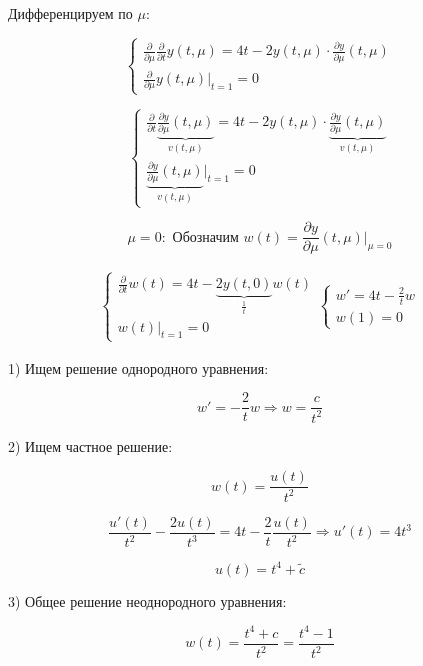 \documentclass[12pt, a4paper]{report}
\begin{document}
Дифференцируем по \( \mu  \): 

\[ \begin{cases}
    \displaystyle \frac{\partial  }{\partial  \mu } \frac{\partial  }{\partial  t } y(t ,\mu ) = 4 t - 2 y(t,\mu)   \cdot \frac{\partial  y }{\partial  \mu }(t,\mu ) \\
    \displaystyle \frac{\partial  }{\partial  \mu } y (t,\mu ) |_{t =1 }  =0 
\end{cases} \] 

\[ \begin{cases}
\displaystyle \frac{\partial  }{\partial  t } \underbrace{\frac{\partial  y }{\partial  \mu } (t ,\mu )}_{ v(t, \mu)} = 4 t - 2 y ( t, \mu ) \cdot \underbrace{\frac{\partial  y }{\partial  \mu } (t ,\mu )}_{ v(t, \mu)}   \\
\displaystyle \underbrace{\frac{\partial  y }{\partial  \mu } (t ,\mu )}_{ v(t, \mu)}|_{t =1 }  =0 
\end{cases} \] 

\[ \mu = 0 : \text{ Обозначим } w (t ) = \frac{\partial  y } {\partial  \mu } (t , \mu ) |_{\mu =0}    \] 

\[\begin{aligned}
    \begin{cases}
        \displaystyle \frac{\partial  }{\partial  t }w (t ) = 4 t - \underbrace{2 y (t, 0 )}_{\frac{1}{t} } w (t ) \\ 
        w(t ) |_{t =1} = 0  
    \end{cases}
    \begin{cases}
    \displaystyle w' = 4 t - \frac{2}{t }  w \\ 
    w(1 ) = 0
    \end{cases}
\end{aligned} \] 

1) Ищем решение однородного уравнения: 

\[ \displaystyle w ' = -\frac{2}{t } w \Rightarrow  w  =  \frac{c}{t ^2 }  \]

2) Ищем частное решение: 

\[ \displaystyle  w( t ) = \frac{ u (t )}{t ^2 }   \] 

\[ \frac{ u ' (t )}{t ^2 } - \frac{ 2 u(t )}{t ^3} = 4 t - \frac{2}{t }  \frac{u (t )}{t ^2 } \Rightarrow u'(t ) = 4 t ^3    \] 

\[ u(t ) = t ^4 + \tilde{c }\] 

3) Общее решение неоднородного уравнения: 

\[ w(t ) =  \frac{ t ^{ 4 }  + c }{t ^2 } = \frac{ t ^{ 4 } -1       }{ t ^2 }   \] 
\end{document}
